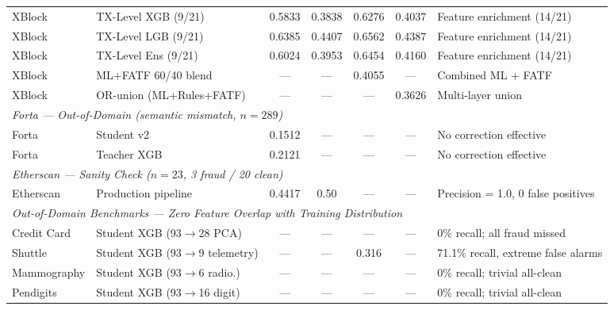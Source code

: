\documentclass[journal]{IEEEtran}
\begin{document}
\begin{table}[!t]
\begin{tabular}{llccccl}
XBlock & TX-Level XGB (9/21) & 0.5833 & 0.3838 & 0.6276 & 0.4037 & Feature enrichment (14/21) \\
XBlock & TX-Level LGB (9/21) & 0.6385 & 0.4407 & 0.6562 & 0.4387 & Feature enrichment (14/21) \\
XBlock & TX-Level Ens (9/21) & 0.6024 & 0.3953 & 0.6454 & 0.4160 & Feature enrichment (14/21) \\
XBlock & ML+FATF 60/40 blend & --- & --- & 0.4055 & --- & Combined ML + FATF \\
XBlock & OR-union (ML+Rules+FATF) & --- & --- & --- & 0.3626 & Multi-layer union \\
\midrule
\multicolumn{7}{l}{\textit{Forta --- Out-of-Domain (semantic mismatch, $n = 289$)}} \\
\cmidrule(l){1-7}
Forta & Student v2 & 0.1512 & --- & --- & --- & No correction effective \\
Forta & Teacher XGB & 0.2121 & --- & --- & --- & No correction effective \\
\midrule
\multicolumn{7}{l}{\textit{Etherscan --- Sanity Check ($n = 23$, 3 fraud / 20 clean)}} \\
\cmidrule(l){1-7}
Etherscan & Production pipeline & 0.4417 & 0.50 & --- & --- & Precision = 1.0, 0 false positives \\
\midrule
\multicolumn{7}{l}{\textit{Out-of-Domain Benchmarks --- Zero Feature Overlap with Training Distribution}} \\
\cmidrule(l){1-7}
Credit Card & Student XGB (93$\to$28 PCA) & --- & --- & --- & --- & 0\% recall; all fraud missed \\
Shuttle & Student XGB (93$\to$9 telemetry) & --- & --- & 0.316 & --- & 71.1\% recall, extreme false alarms \\
Mammography & Student XGB (93$\to$6 radio.) & --- & --- & --- & --- & 0\% recall; trivial all-clean \\
Pendigits & Student XGB (93$\to$16 digit) & --- & --- & --- & --- & 0\% recall; trivial all-clean \\
\bottomrule
\end{tabular}
\end{table}
\end{document}
